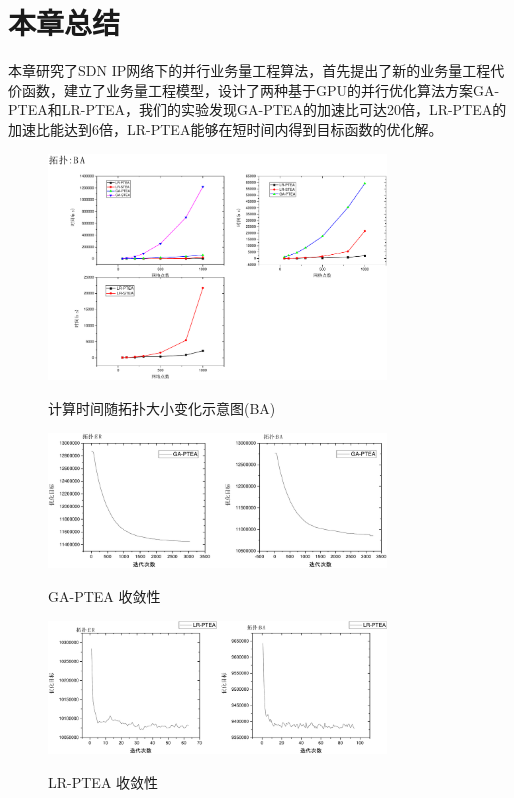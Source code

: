 \section{本章总结}
本章研究了SDN IP网络下的并行业务量工程算法，首先提出了新的业务量工程代价函数，建立了业务量工程模型，设计了两种基于GPU的并行优化算法方案GA-PTEA和LR-PTEA，我们的实验发现GA-PTEA的加速比可达20倍，LR-PTEA的加速比能达到6倍，LR-PTEA能够在短时间内得到目标函数的优化解。

\begin{figure}
\vspace{-0.2cm} 
\setlength{\abovecaptionskip}{-0.5cm}
\begin{center}
{\includegraphics[width=0.8\textwidth]{figures/TI-BA-NO.pdf}}
\end{center}
\caption{{\footnotesize{计算时间随拓扑大小变化示意图(BA)}}}
\label{TI-ER-NO}
\end{figure}
\begin{figure}
\vspace{-0.2cm} 
\setlength{\abovecaptionskip}{-0.5cm}
\begin{center}
{\includegraphics[width=0.8\textwidth]{figures/GA-CO.pdf}}
\end{center}
\caption{{\footnotesize{GA-PTEA 收敛性}}}
\label{GA-CO}
\end{figure}
\begin{figure}
\setlength{\abovecaptionskip}{-0.5cm}
\begin{center}
{\includegraphics[width=0.8\textwidth]{figures/LR-CO.pdf}}
\end{center}
\caption{{\footnotesize{LR-PTEA 收敛性}}}
\label{LR-CO}
\end{figure}






